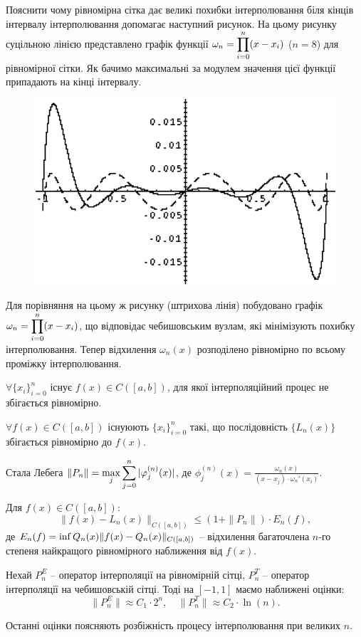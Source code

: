 Пояснити чому рівномірна сітка дає великі похибки інтерполювання біля кінців інтервалу інтерполювання допомагає наступний рисунок. На цьому рисунку суцільною лінією представлено графік функції $\omega_n = \displaystyle\prod\limits_{i=0}^n (x-x_i)$ ($n=8$) для рівномірної сітки. Як бачимо максимальні за модулем значення цієї функції припадають на кінці інтервалу.
\begin{figure}[H]
    \centering
    \includegraphics[width=.5\linewidth]{mal-6.png}
\end{figure}
Для порівняння на цьому ж рисунку (штрихова лінія) побудовано графік $\omega_n = \displaystyle\prod\limits_{i=0}^n (x-x_i)$, що відповідає чебишовським вузлам, які мінімізують похибку інтерполювання. Тепер відхилення $\omega_n(x)$ розподілено рівномірно по всьому проміжку інтерполювання.
\begin{theorem}[Фабера]
    $\forall \{x_i\}_{i=0}^n$ існує $f(x)\in C([a,b])$, для якої інтерполяційний процес не збігається рівномірно.
\end{theorem}
\begin{theorem}[Марцинкевича]
    $\forall f(x) \in C([a,b])$ існуюють $\{x_i\}_{i=0}^n$ такі, що послідовність $\{L_n(x)\}$ збігається рівномірно до $f(x)$.
\end{theorem}
\begin{theorem}
    Стала Лебега $\|P_n\| = \displaystyle\max\limits_{j} \displaystyle\sum\limits_{j=0}^n |\varphi_j^{(n)}(x)|$, де $\phi_j^{(n)}(x) = \frac{\omega_n(x)}{(x-x_j)\cdot\omega_n'(x_i)}$.
\end{theorem}
\begin{theorem}
    Для $f(x)\in C([a,b])$:
    \[\|f(x)-L_n(x)\|_{C([a,b])} \le (1 + \|P_n\|) \cdot E_n(f),\]
    де $E_n(f) = \displaystyle\inf\limits{Q_n(x)} \|f(x)-Q_n(x)\|_{C([a,b])}$ -- відхилення багаточлена $n$-го степеня найкращого рівномірного наближення від $f(x)$.
\end{theorem}
\begin{theorem}
    Нехай $P_n^E$ -- оператор інтерполяції на рівномірній сітці, $P_n^T$ -- оператор інтерполяції на чебишовській сітці. Тоді на $[-1,1]$ маємо наближені оцінки:
    \[ \|P_n^E\|\approx C_1 \cdot 2^n, \quad \|P_n^T\|\approx C_2\cdot \ln(n).\]
\end{theorem}
Останні оцінки поясняють розбіжність процесу інтерполювання при великих $n$.
